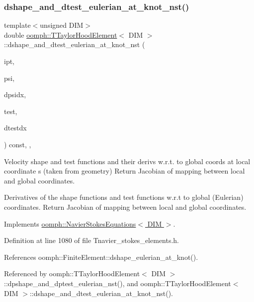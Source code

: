 \subsubsection{\texorpdfstring{dshape\+\_\+and\+\_\+dtest\+\_\+eulerian\+\_\+at\+\_\+knot\+\_\+nst()}{dshape\_and\_dtest\_eulerian\_at\_knot\_nst()}\hspace{0.1cm}{\footnotesize\ttfamily [1/4]}}
{\footnotesize\ttfamily template$<$unsigned D\+IM$>$ \\
double \hyperlink{classoomph_1_1TTaylorHoodElement}{oomph\+::\+T\+Taylor\+Hood\+Element}$<$ D\+IM $>$\+::dshape\+\_\+and\+\_\+dtest\+\_\+eulerian\+\_\+at\+\_\+knot\+\_\+nst (\begin{DoxyParamCaption}\item[{const unsigned \&}]{ipt,  }\item[{\hyperlink{classoomph_1_1Shape}{Shape} \&}]{psi,  }\item[{\hyperlink{classoomph_1_1DShape}{D\+Shape} \&}]{dpsidx,  }\item[{\hyperlink{classoomph_1_1Shape}{Shape} \&}]{test,  }\item[{\hyperlink{classoomph_1_1DShape}{D\+Shape} \&}]{dtestdx }\end{DoxyParamCaption}) const\hspace{0.3cm}{\ttfamily [inline]}, {\ttfamily [protected]}, {\ttfamily [virtual]}}



Velocity shape and test functions and their derivs w.\+r.\+t. to global coords at local coordinate s (taken from geometry) Return Jacobian of mapping between local and global coordinates. 

Derivatives of the shape functions and test functions w.\+r.\+t to global (Eulerian) coordinates. Return Jacobian of mapping between local and global coordinates. 

Implements \hyperlink{classoomph_1_1NavierStokesEquations_a46f9c15f162160fab6419f60ef619916}{oomph\+::\+Navier\+Stokes\+Equations$<$ D\+I\+M $>$}.



Definition at line 1080 of file Tnavier\+\_\+stokes\+\_\+elements.\+h.



References oomph\+::\+Finite\+Element\+::dshape\+\_\+eulerian\+\_\+at\+\_\+knot().



Referenced by oomph\+::\+T\+Taylor\+Hood\+Element$<$ D\+I\+M $>$\+::dpshape\+\_\+and\+\_\+dptest\+\_\+eulerian\+\_\+nst(), and oomph\+::\+T\+Taylor\+Hood\+Element$<$ D\+I\+M $>$\+::dshape\+\_\+and\+\_\+dtest\+\_\+eulerian\+\_\+at\+\_\+knot\+\_\+nst().


